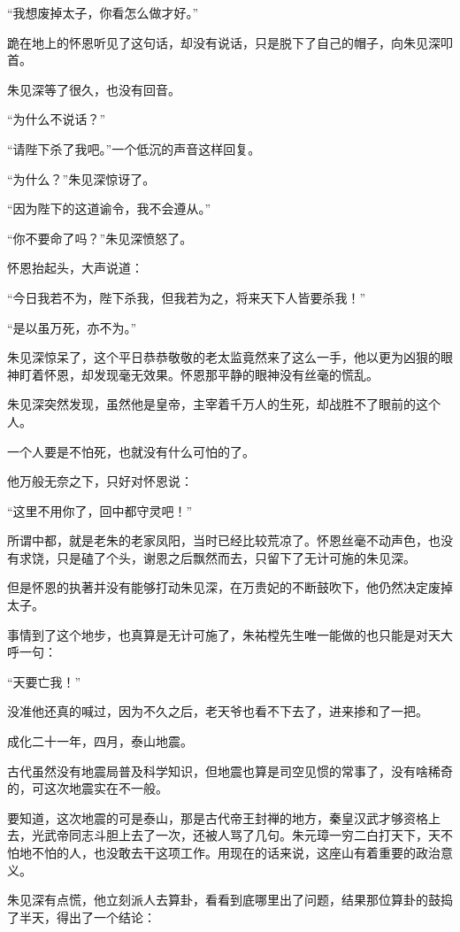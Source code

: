 \begin{multicols}{\theparacolNo}
		“我想废掉太子，你看怎么做才好。”

		跪在地上的怀恩听见了这句话，却没有说话，只是脱下了自己的帽子，向朱见深叩首。

		朱见深等了很久，也没有回音。

		“为什么不说话？”

		“请陛下杀了我吧。”一个低沉的声音这样回复。

		“为什么？”朱见深惊讶了。

		“因为陛下的这道谕令，我不会遵从。”

		“你不要命了吗？”朱见深愤怒了。

		怀恩抬起头，大声说道：

		“今日我若不为，陛下杀我，但我若为之，将来天下人皆要杀我！”

		“是以虽万死，亦不为。”

		朱见深惊呆了，这个平日恭恭敬敬的老太监竟然来了这么一手，他以更为凶狠的眼神盯着怀恩，却发现毫无效果。怀恩那平静的眼神没有丝毫的慌乱。

		朱见深突然发现，虽然他是皇帝，主宰着千万人的生死，却战胜不了眼前的这个人。

		一个人要是不怕死，也就没有什么可怕的了。

		他万般无奈之下，只好对怀恩说：

		“这里不用你了，回中都守灵吧！”

		所谓中都，就是老朱的老家凤阳，当时已经比较荒凉了。怀恩丝毫不动声色，也没有求饶，只是磕了个头，谢恩之后飘然而去，只留下了无计可施的朱见深。

		但是怀恩的执著并没有能够打动朱见深，在万贵妃的不断鼓吹下，他仍然决定废掉太子。

		事情到了这个地步，也真算是无计可施了，朱祐樘先生唯一能做的也只能是对天大呼一句：

		“天要亡我！”

		没准他还真的喊过，因为不久之后，老天爷也看不下去了，进来掺和了一把。

		成化二十一年，四月，泰山地震。

		古代虽然没有地震局普及科学知识，但地震也算是司空见惯的常事了，没有啥稀奇的，可这次地震实在不一般。

		要知道，这次地震的可是泰山，那是古代帝王封禅的地方，秦皇汉武才够资格上去，光武帝同志斗胆上去了一次，还被人骂了几句。朱元璋一穷二白打天下，天不怕地不怕的人，也没敢去干这项工作。用现在的话来说，这座山有着重要的政治意义。

		朱见深有点慌，他立刻派人去算卦，看看到底哪里出了问题，结果那位算卦的鼓捣了半天，得出了一个结论：


\end{multicols}
